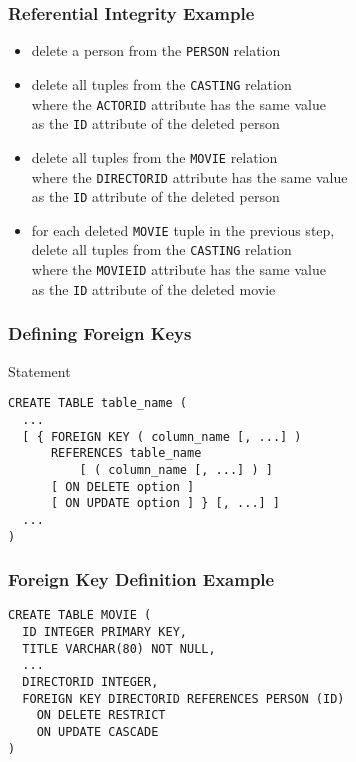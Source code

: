 \documentclass[dvipsnames]{beamer}
\theoremstyle{plain}
\begin{document}
\begin{frame}[fragile]
  \frametitle{Referential Integrity Example}

  \begin{example}
    \begin{itemize}
      \item delete a person from the \texttt{PERSON} relation

      \pause
      \item delete all tuples from the \texttt{CASTING} relation\\
	where the \texttt{ACTORID} attribute has the same value\\
	as the \texttt{ID} attribute of the deleted person

      \pause
      \item delete all tuples from the \texttt{MOVIE} relation\\
        where the \texttt{DIRECTORID} attribute has the same value\\
        as the \texttt{ID} attribute of the deleted person

      \pause
      \item for each deleted \texttt{MOVIE} tuple in the previous step,\\
	delete all tuples from the \texttt{CASTING} relation\\
	where the \texttt{MOVIEID} attribute has the same value\\
	as the \texttt{ID} attribute of the deleted movie

    \end{itemize}
  \end{example}
\end{frame}

\begin{frame}[fragile]
  \frametitle{Defining Foreign Keys}

  \begin{block}{Statement}
    \begin{lstlisting}
CREATE TABLE table_name (
  ...
  [ { FOREIGN KEY ( column_name [, ...] )
      REFERENCES table_name
          [ ( column_name [, ...] ) ]
      [ ON DELETE option ]
      [ ON UPDATE option ] } [, ...] ]
  ...
)
    \end{lstlisting}
  \end{block}
\end{frame}

\begin{frame}[fragile]
  \frametitle{Foreign Key Definition Example}

  \begin{example}
    \begin{lstlisting}
CREATE TABLE MOVIE (
  ID INTEGER PRIMARY KEY,
  TITLE VARCHAR(80) NOT NULL,
  ...
  DIRECTORID INTEGER,
  FOREIGN KEY DIRECTORID REFERENCES PERSON (ID)
    ON DELETE RESTRICT
    ON UPDATE CASCADE
)
    \end{lstlisting}
  \end{example}
\end{frame}
\end{document}
